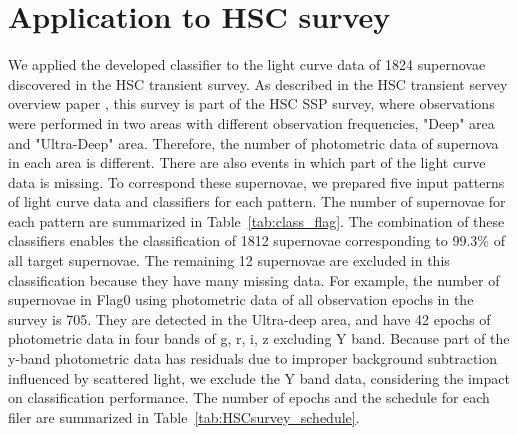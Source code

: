 \documentclass[useamsfonts]{pasj01}
\begin{document}
\section{Application to HSC survey}
\label{sec:h}
%
We applied the developed classifier to the light curve data of 1824 supernovae discovered in the HSC transient survey.
As described in the HSC transient servey overview paper \citep{yasuda19a}, this survey is part of the HSC SSP survey, where observations were performed in two areas with different observation frequencies, "Deep" area and "Ultra-Deep" area.
Therefore, the number of photometric data of supernova in each area is different.
There are also events in which part of the light curve data is missing.
To correspond these supernovae, we prepared five input patterns of light curve data and classifiers for each pattern.
The number of supernovae for each pattern are summarized in Table\ \ref{tab:class_flag}.
The combination of these classifiers enables the classification of 1812 supernovae corresponding to 99.3\% of all target supernovae.
The remaining 12 supernovae are excluded in this classification because they have many missing data.
For example, the number of supernovae in Flag0 using photometric data of all observation epochs in the survey is 705.
They are detected in the Ultra-deep area, and have 42 epochs of photometric data in four bands of g, r, i, z excluding Y band.
Because part of the y-band photometric data has residuals due to improper background subtraction influenced by scattered light,
we exclude the Y band data, considering the impact on classification performance.
The number of epochs and the schedule for each filer are summarized in Table\ \ref{tab:HSCsurvey_schedule}.
%
\begin{table}[ht]
\label{tab:class_flag}
\end{table}
\end{document}
